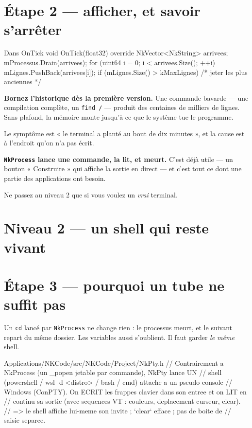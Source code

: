 \section{Étape 2 --- afficher, et savoir s'arrêter}

\begin{nkcode}{Dans OnTick}
void OnTick(float32) override {
    NkVector<NkString> arrivees;
    mProcessus.Drain(arrivees);
    for (uint64 i = 0; i < arrivees.Size(); ++i) { mLignes.PushBack(arrivees[i]); }
    if (mLignes.Size() > kMaxLignes) { /* jeter les plus anciennes */ }
}
\end{nkcode}

\begin{nkpiege}
\textbf{Bornez l'historique dès la première version.} Une commande bavarde
--- une compilation complète, un \texttt{find /} --- produit des centaines de
milliers de lignes. Sans plafond, la mémoire monte jusqu'à ce que le système
tue le programme.

Le symptôme est « le terminal a planté au bout de dix minutes », et la cause est
à l'endroit qu'on n'a pas écrit.
\end{nkpiege}

\begin{nkretenir}
\textbf{\texttt{NkProcess} lance une commande, la lit, et meurt.} C'est déjà
utile --- un bouton « Construire » qui affiche la sortie en direct --- et c'est
tout ce dont une partie des applications ont besoin.

Ne passez au niveau 2 que si vous voulez un \emph{vrai} terminal.
\end{nkretenir}

\section*{Niveau 2 --- un shell qui reste vivant}

\section{Étape 3 --- pourquoi un tube ne suffit pas}

Un \texttt{cd} lancé par \texttt{NkProcess} ne change rien : le processus meurt,
et le suivant repart du même dossier. Les variables aussi s'oublient. Il faut
garder \emph{le même} shell.

\begin{nkcode}{Applications/NKCode/src/NKCode/Project/NkPty.h}
// Contrairement a NkProcess (un _popen jetable par commande), NkPty lance UN
// shell (powershell / wsl -d <distro> / bash / cmd) attache a un pseudo-console
// Windows (ConPTY). On ECRIT les frappes clavier dans son entree et on LIT en
// continu sa sortie (avec sequences VT : couleurs, deplacement curseur, clear).
// => le shell affiche lui-meme son invite ; `clear` efface ; pas de boite de
//    saisie separee.
\end{nkcode}

